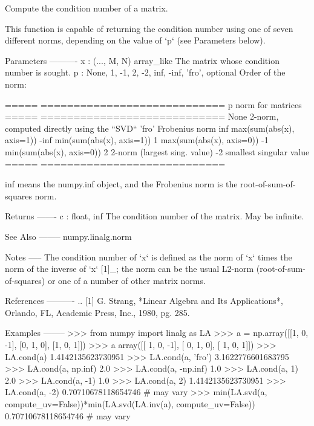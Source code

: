 \begin{DoxyVerb}Compute the condition number of a matrix.

This function is capable of returning the condition number using
one of seven different norms, depending on the value of `p` (see
Parameters below).

Parameters
----------
x : (..., M, N) array_like
    The matrix whose condition number is sought.
p : {None, 1, -1, 2, -2, inf, -inf, 'fro'}, optional
    Order of the norm:

    =====  ============================
    p      norm for matrices
    =====  ============================
    None   2-norm, computed directly using the ``SVD``
    'fro'  Frobenius norm
    inf    max(sum(abs(x), axis=1))
    -inf   min(sum(abs(x), axis=1))
    1      max(sum(abs(x), axis=0))
    -1     min(sum(abs(x), axis=0))
    2      2-norm (largest sing. value)
    -2     smallest singular value
    =====  ============================

    inf means the numpy.inf object, and the Frobenius norm is
    the root-of-sum-of-squares norm.

Returns
-------
c : {float, inf}
    The condition number of the matrix. May be infinite.

See Also
--------
numpy.linalg.norm

Notes
-----
The condition number of `x` is defined as the norm of `x` times the
norm of the inverse of `x` [1]_; the norm can be the usual L2-norm
(root-of-sum-of-squares) or one of a number of other matrix norms.

References
----------
.. [1] G. Strang, *Linear Algebra and Its Applications*, Orlando, FL,
       Academic Press, Inc., 1980, pg. 285.

Examples
--------
>>> from numpy import linalg as LA
>>> a = np.array([[1, 0, -1], [0, 1, 0], [1, 0, 1]])
>>> a
array([[ 1,  0, -1],
       [ 0,  1,  0],
       [ 1,  0,  1]])
>>> LA.cond(a)
1.4142135623730951
>>> LA.cond(a, 'fro')
3.1622776601683795
>>> LA.cond(a, np.inf)
2.0
>>> LA.cond(a, -np.inf)
1.0
>>> LA.cond(a, 1)
2.0
>>> LA.cond(a, -1)
1.0
>>> LA.cond(a, 2)
1.4142135623730951
>>> LA.cond(a, -2)
0.70710678118654746 # may vary
>>> min(LA.svd(a, compute_uv=False))*min(LA.svd(LA.inv(a), compute_uv=False))
0.70710678118654746 # may vary\end{DoxyVerb}
 \mbox{\label{namespacenumpy_1_1linalg_1_1linalg_a6b97f460ca58db032dab55e93d504d9e}} 
